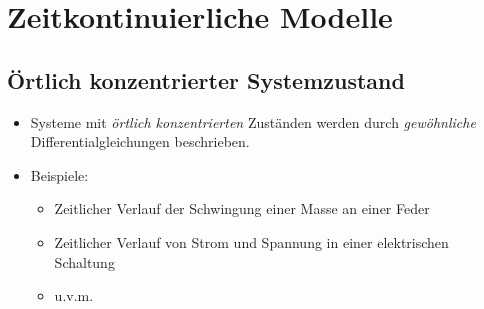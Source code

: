 \chapter{Zeitkontinuierliche Modelle} %
    \section{Örtlich konzentrierter Systemzustand} %
        \begin{itemize}
        	\item Systeme mit \textit{örtlich konzentrierten} Zuständen werden durch \textit{gewöhnliche} Differentialgleichungen beschrieben.
        	\item Beispiele:
	        	\begin{itemize}
	        		\item Zeitlicher Verlauf der Schwingung einer Masse an einer Feder
	        		\item Zeitlicher Verlauf von Strom und Spannung in einer elektrischen Schaltung
	        		\item u.v.m.
	        	\end{itemize}
        \end{itemize}

